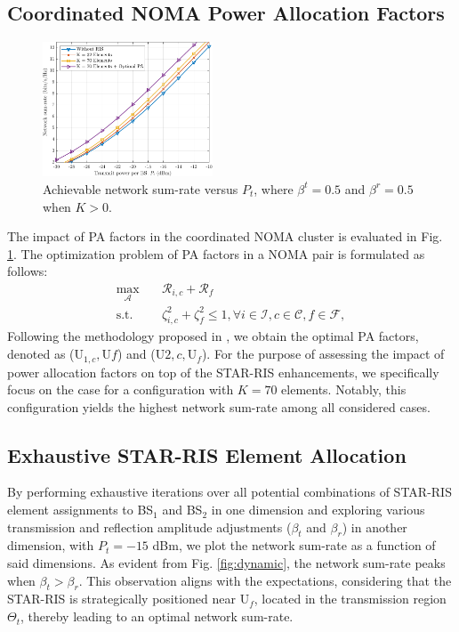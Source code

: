 \documentclass[conference]{IEEEtran}
\begin{document}
\subsection{Coordinated NOMA Power Allocation Factors}
\begin{figure}[t]
    \centering
    \includegraphics[width=0.45\textwidth]{figs/sumrate.pdf}
    \caption{Achievable network sum-rate versus $P_{t}$, where $\beta^t=0.5$ and $\beta^r=0.5$ when $K > 0$.}
    \label{fig:sumrate}
\end{figure}
The impact of PA factors in the coordinated NOMA cluster is evaluated in Fig. \ref{fig:sumrate}. The optimization problem of PA factors in a NOMA pair is formulated as follows:
\begin{align}
\max_{\mathbf{\mathcal{A}}} \quad & \mathcal{R}_{i,c} + \mathcal{R}_{f} \label{eq:opt2} \\
\textrm{s.t.}
    \quad & \zeta_{i,c}^2 + \zeta_f^2\leq1, \forall i \in \mathcal{I}, c \in \mathcal{C}, f \in \mathcal{F}, \nonumber
\end{align}
Following the methodology proposed in \cite{fang2016energy}, we obtain the optimal PA factors, denoted as (${\text{U}_{1,c}, \text{U}f}$) and (${\text{U}{2,c}, \text{U}_f}$). For the purpose of assessing the impact of power allocation factors on top of the STAR-RIS enhancements, we specifically focus on the case for a configuration with $K=70$ elements. Notably, this configuration yields the highest network sum-rate among all considered cases.

\subsection{Exhaustive STAR-RIS Element Allocation}
By performing exhaustive iterations over all potential combinations of STAR-RIS element assignments to BS$_1$ and BS$_2$ in one dimension and exploring various transmission and reflection amplitude adjustments ($\beta_t$ and $\beta_r$) in another dimension, with $P_t = -15$ dBm, we plot the network sum-rate as a function of said dimensions. As evident from Fig. \ref{fig:dynamic}, the network sum-rate peaks when $\beta_t > \beta_r$. This observation aligns with the expectations, considering that the STAR-RIS is strategically positioned near U$_f$, located in the transmission region $\Theta_t$, thereby leading to an optimal network sum-rate.
\end{document}
